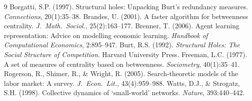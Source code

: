\documentclass[11pt]{article}
\begin{document}
\begin{thebibliography}{9}
 Borgatti, S.P. (1997). Structural holes: Unpacking Burt's redundancy measures. \emph{Connections}, 20(1):35--38.
 Brandes, U. (2001). A faster algorithm for betweenness centrality. \emph{J.\ Math.\ Sociol.}, 25(2):163--177.
 Brenner, T. (2006). Agent learning representation: Advice on modelling economic learning. \emph{Handbook of Computational Economics}, 2:895--947.
 Burt, R.S. (1992). \emph{Structural Holes: The Social Structure of Competition}. Harvard University Press.
 Freeman, L.C. (1977). A set of measures of centrality based on betweenness. \emph{Sociometry}, 40(1):35--41.
 Rogerson, R., Shimer, R., \& Wright, R. (2005). Search-theoretic models of the labor market: A survey. \emph{J.\ Econ.\ Lit.}, 43(4):959--988.
 Watts, D.J., \& Strogatz, S.H. (1998). Collective dynamics of `small-world' networks. \emph{Nature}, 393:440--442.
\end{thebibliography}
\end{document}

